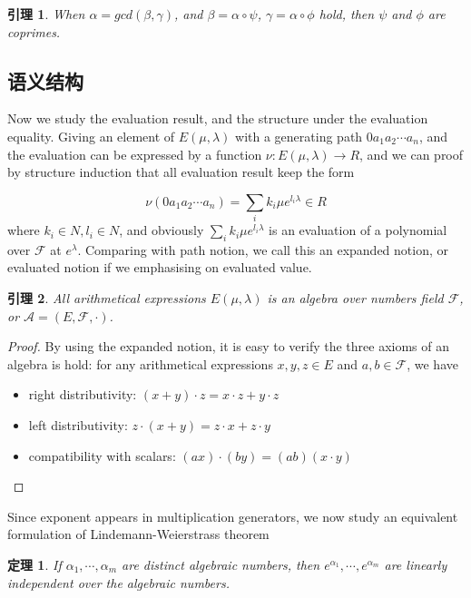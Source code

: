 \documentclass[a4paper,12pt]{article}
\numberwithin{definition}{section}
\newtheorem{lemma}{引理}
\numberwithin{lemma}{section}
\numberwithin{proposition}{section}
\newtheorem{theorem}{定理}
\numberwithin{theorem}{section}
\numberwithin{grammar}{section}
\numberwithin{program}{section}
\numberwithin{convention}{section}
\numberwithin{corollary}{section}
\begin{document}
\begin{lemma}
\label{lemma:coprimes}
When $\alpha = gcd(\beta, \gamma)$, and $\beta = \alpha \circ \psi$, $\gamma = \alpha \circ \phi$ hold, then $\psi$ and $\phi$ are coprimes.
\end{lemma}

\subsection{语义结构}\label{sec:semantical}

Now we study the evaluation result, and the structure under the evaluation equality.
Giving an element of $E(\mu, \lambda)$ with a generating path $0 a_1 a_2 \cdots a_n$,
and the evaluation can be expressed by a function $\nu: E(\mu, \lambda) \to R$,
and we can proof by structure induction that all evaluation result keep the form

$$
\nu(0 a_1 a_2 \cdots a_n) = \sum_{i} k_i \mu e^{l_i \lambda} \in R
$$
where $k_i \in N, l_i \in N$, and obviously $\sum_{i} k_i \mu e^{l_i \lambda}$ is an evaluation of a polynomial over $\mathcal{F}$ at $e^{\lambda}$.
Comparing with path notion, we call this an expanded notion, or evaluated notion if we emphasising on evaluated value.

\begin{lemma}
\label{lemma:arithmeticalalgebra}
All arithmetical expressions $E(\mu, \lambda)$ is an algebra over numbers field $\mathcal{F}$, or $\mathcal{A} = (E, \mathcal{F}, \cdot)$.
\end{lemma}

\begin{proof}
By using the expanded notion, it is easy to verify the three axioms of an algebra is hold:
for any arithmetical expressions $x, y, z \in E$ and $a, b \in \mathcal{F}$, we have
\begin{itemize}
    \item right distributivity: $(x + y) \cdot z = x \cdot z + y \cdot z$
    \item left distributivity: $z \cdot (x + y) = z \cdot x + z \cdot y$
    \item compatibility with scalars: $(ax) \cdot (by) = (ab) (x \cdot y)$
\end{itemize}
\qedhere
\end{proof}

Since exponent appears in multiplication generators, we now study an equivalent formulation of Lindemann-Weierstrass theorem

\begin{theorem}
\label{theorem:LindemannWeierstrass}
If $\alpha_1, \cdots, \alpha_m$ are distinct algebraic numbers, then $e^{\alpha_1}, \cdots, e^{\alpha_m}$ are linearly independent over the algebraic numbers.
\end{theorem}
\end{document}
